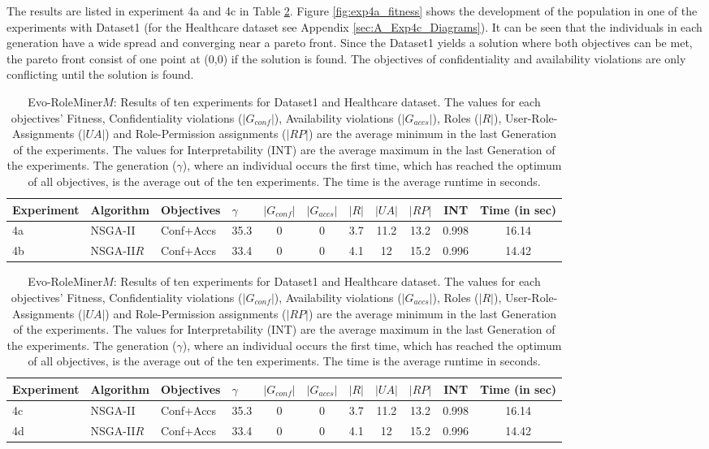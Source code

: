 The results are listed in experiment 4a and 4c in Table \ref{tab:exp4_results}. Figure \ref{fig:exp4a_fitness} shows the development of the population in one of the experiments with Dataset1 (for the Healthcare dataset see Appendix \ref{sec:A_Exp4c_Diagrams}). It can be seen that the individuals in each generation have a wide spread and converging near a pareto front. Since the Dataset1 yields a solution where both objectives can be met, the pareto front consist of one point at (0,0) if the solution is found. The objectives of confidentiality and availability violations are only conflicting until the solution is found.

\begin{table}
	\centering
	\caption{Evo-RoleMiner$M$: Results of ten experiments for Dataset1 and Healthcare dataset. The values for each objectives' Fitness, Confidentiality violations ($|G_{conf}|$), Availability violations ($|G_{accs}|$), Roles ($|R|$), User-Role-Assignments ($|UA|$) and Role-Permission assignments ($|RP|$) are the average minimum in the last Generation of the experiments. The values for Interpretability (INT) are the average maximum in the last Generation of the experiments. The generation ($\gamma$), where an individual occurs the first time, which has reached the optimum of all objectives, is the average out of the ten experiments. The time is the average runtime in seconds.}
	\label{tab:exp4_results}
	\begin{adjustbox}{width=\textwidth}
		\begin{tabular}{|l|l|l|l|c|c|c|c|c|c|c|}
			\hline
			\rowcolor{myGray} 
			\textbf{Experiment} & \textbf{Algorithm} & \textbf{Objectives} & $\gamma$ & \textbf{$|G_{conf}|$} & \textbf{$|G_{accs}|$} & \textbf{$|R|$} & \textbf{$|UA|$} & \textbf{$|RP|$} & \textbf{INT} & \textbf{Time (in sec)}\\ \hline
			4a & NSGA-II & Conf+Accs &  35.3 &   0   &   0 & 3.7   &   11.2   &   13.2   &   0.998    & 16.14\\ \hline
			4b & NSGA-II$R$ & Conf+Accs &   33.4&   0   &   0 & 4.1   &   12   &   15.2   &   0.996    & 14.42\\ \hline			
		\end{tabular}
	\end{adjustbox}
	\begin{adjustbox}{width=\textwidth}
		\begin{tabular}{|l|l|l|l|c|c|c|c|c|c|c|}
			\hline
			\rowcolor{myGray} 
			\textbf{Experiment} & \textbf{Algorithm} & \textbf{Objectives} & $\gamma$ & \textbf{$|G_{conf}|$} & \textbf{$|G_{accs}|$} & \textbf{$|R|$} & \textbf{$|UA|$} & \textbf{$|RP|$} & \textbf{INT} & \textbf{Time (in sec)}\\ \hline
			4c & NSGA-II & Conf+Accs &  35.3 &   0   &   0 & 3.7   &   11.2   &   13.2   &   0.998    & 16.14\\ \hline
			4d & NSGA-II$R$ & Conf+Accs   &   33.4&   0   &   0 & 4.1   &   12   &   15.2   &   0.996    & 14.42\\ \hline			
		\end{tabular}
	\end{adjustbox}
\end{table}

